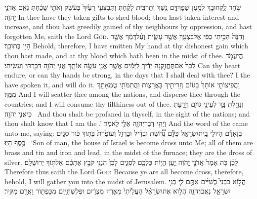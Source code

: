 {שֹׁ֥חַד לָֽקְחוּ\maqqaf בָ֖ךְ לְמַ֣עַן שְׁפׇךְ\maqqaf דָּ֑ם נֶ֧שֶׁךְ וְתַרְבִּ֣ית לָקַ֗חַתְּ וַתְּבַצְּעִ֤י רֵעַ֙יִךְ֙ בַּעֹ֔שֶׁק וְאֹתִ֣י שָׁכַ֔חַתְּ נְאֻ֖ם אֲדֹנָ֥י יֱהֹוִֽה׃}
{In thee have they taken gifts to shed blood; thou hast taken interest and increase, and thou hast greedily gained of thy neighbours by oppression, and hast forgotten Me, saith the Lord \textsc{God}.}
{וְהִנֵּה֙ הִכֵּ֣יתִי כַפִּ֔י אֶל\maqqaf בִּצְעֵ֖ךְ אֲשֶׁ֣ר עָשִׂ֑ית וְעַ֨ל\maqqaf דָּמֵ֔ךְ אֲשֶׁ֥ר הָי֖וּ בְּתוֹכֵֽךְ׃}
{Behold, therefore, I have smitten My hand at thy dishonest gain which thou hast made, and at thy blood which hath been in the midst of thee.}
{הֲיַעֲמֹ֤ד לִבֵּךְ֙ אִם\maqqaf תֶּחֱזַ֣קְנָה יָדַ֔יִךְ לַיָּמִ֕ים אֲשֶׁ֥ר אֲנִ֖י עֹשֶׂ֣ה אוֹתָ֑ךְ אֲנִ֥י יְהֹוָ֖ה דִּבַּ֥רְתִּי וְעָשִֽׂיתִי׃}
{Can thy heart endure, or can thy hands be strong, in the days that I shall deal with thee? I the \lord\space have spoken it, and will do it.}
{וַהֲפִיצוֹתִ֤י אוֹתָךְ֙ בַּגּוֹיִ֔ם וְזֵרִיתִ֖יךְ בָּאֲרָצ֑וֹת וַהֲתִמֹּתִ֥י טֻמְאָתֵ֖ךְ מִמֵּֽךְ׃}
{And I will scatter thee among the nations, and disperse thee through the countries; and I will consume thy filthiness out of thee.}
{וְנִחַ֥לְתְּ בָּ֖ךְ לְעֵינֵ֣י גוֹיִ֑ם וְיָדַ֖עַתְּ כִּי\maqqaf אֲנִ֥י יְהֹוָֽה׃ \petucha }
{And thou shalt be profaned in thyself, in the sight of the nations; and thou shalt know that I am the \lord.’}
{וַיְהִ֥י דְבַר\maqqaf יְהֹוָ֖ה אֵלַ֥י לֵאמֹֽר׃}
{And the word of the \lord\space came unto me, saying:}
{בֶּן\maqqaf אָדָ֕ם הָיוּ\maqqaf לִ֥י בֵֽית\maqqaf יִשְׂרָאֵ֖ל  כֻּלָּ֡ם נְ֠חֹ֠שֶׁת וּבְדִ֨יל וּבַרְזֶ֤ל וְעוֹפֶ֙רֶת֙ בְּת֣וֹךְ כּ֔וּר סִגִ֥ים כֶּ֖סֶף הָיֽוּ׃ \setuma }
{‘Son of man, the house of Israel is become dross unto Me; all of them are brass and tin and iron and lead, in the midst of the furnace; they are the dross of silver.}
{לָכֵ֗ן כֹּ֤ה אָמַר֙ אֲדֹנָ֣י יֱהֹוִ֔ה יַ֛עַן הֱי֥וֹת כֻּלְּכֶ֖ם לְסִגִ֑ים לָכֵן֙ הִנְנִ֣י קֹבֵ֣ץ אֶתְכֶ֔ם אֶל\maqqaf תּ֖וֹךְ יְרוּשָׁלָֽ͏ִם׃}
{Therefore thus saith the Lord \textsc{God}: Because ye are all become dross, therefore, behold, I will gather you into the midst of Jerusalem.}
\label{haft_30}
\setcounter{chap}{9}
\setcounter{verse}{7}
{הֲל֣וֹא כִבְנֵי֩ כֻשִׁיִּ֨ים אַתֶּ֥ם לִ֛י בְּנֵ֥י יִשְׂרָאֵ֖ל נְאֻם\maqqaf יְהֹוָ֑ה הֲל֣וֹא אֶת\maqqaf יִשְׂרָאֵ֗ל הֶעֱלֵ֙יתִי֙ מֵאֶ֣רֶץ מִצְרַ֔יִם וּפְלִשְׁתִּיִּ֥ים מִכַּפְתּ֖וֹר וַאֲרָ֥ם מִקִּֽיר׃}
